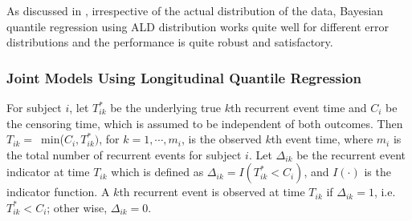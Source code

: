 As discussed in \cite{yu2001bayesian}, irrespective of the actual distribution of the data, Bayesian quantile regression using ALD distribution works quite well for different error distributions and the performance is quite robust and satisfactory.

\subsubsection{Joint Models Using Longitudinal Quantile Regression}

For subject $i$, let $T_{ik}^*$ be the underlying true $k$th recurrent event time and $C_i$ be the censoring time, which is assumed to be independent of both outcomes. Then $T_{ik} = $\mbox{ min}($C_i, T_{ik}^*)$, for $k=1, \cdots, m_i$, is the observed $k$th event time, where $m_i$ is the total number of recurrent events for subject $i$. Let $\Delta_{ik}$ be the recurrent event indicator at time $T_{ik}$ which is defined as $\Delta_{ik} = I(T_{ik}^* < C_i)$, and $I(\cdot)$ is the indicator function. A $k$th recurrent event is observed at time $T_{ik}$ if $\Delta_{ik}=1$, i.e. $T_{ik}^* < C_i$; other wise, $\Delta_{ik}=0$.

